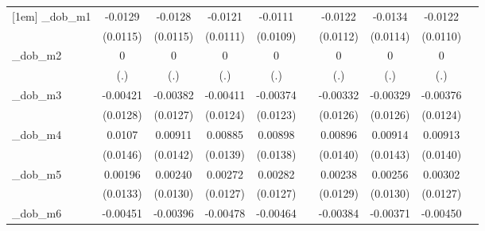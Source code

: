 \begin{table}[htbp]
\begin{tabular}{l*{9}{c}}
[1em]
\_dob\_m1     &     -0.0129         &     -0.0128         &     -0.0121         &     -0.0111         &                     &     -0.0122         &     -0.0134         &     -0.0122         &                     \\
            &    (0.0115)         &    (0.0115)         &    (0.0111)         &    (0.0109)         &                     &    (0.0112)         &    (0.0114)         &    (0.0110)         &                     \\
[1em]
\_dob\_m2     &           0         &           0         &           0         &           0         &                     &           0         &           0         &           0         &                     \\
            &         (.)         &         (.)         &         (.)         &         (.)         &                     &         (.)         &         (.)         &         (.)         &                     \\
[1em]
\_dob\_m3     &    -0.00421         &    -0.00382         &    -0.00411         &    -0.00374         &                     &    -0.00332         &    -0.00329         &    -0.00376         &                     \\
            &    (0.0128)         &    (0.0127)         &    (0.0124)         &    (0.0123)         &                     &    (0.0126)         &    (0.0126)         &    (0.0124)         &                     \\
[1em]
\_dob\_m4     &      0.0107         &     0.00911         &     0.00885         &     0.00898         &                     &     0.00896         &     0.00914         &     0.00913         &                     \\
            &    (0.0146)         &    (0.0142)         &    (0.0139)         &    (0.0138)         &                     &    (0.0140)         &    (0.0143)         &    (0.0140)         &                     \\
[1em]
\_dob\_m5     &     0.00196         &     0.00240         &     0.00272         &     0.00282         &                     &     0.00238         &     0.00256         &     0.00302         &                     \\
            &    (0.0133)         &    (0.0130)         &    (0.0127)         &    (0.0127)         &                     &    (0.0129)         &    (0.0130)         &    (0.0127)         &                     \\
[1em]
\_dob\_m6     &    -0.00451         &    -0.00396         &    -0.00478         &    -0.00464         &                     &    -0.00384         &    -0.00371         &    -0.00450         &                     \\

\end{tabular}
\end{table}

